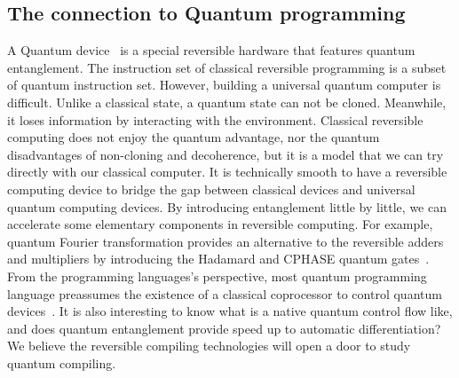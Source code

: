 \documentclass{article}
\newcommand{\<}{\langle}
\renewcommand{\>}{\rangle}
\theoremstyle{definition}\newtheorem{definition}{\textit{Definition}}
\begin{document}
\subsection{The connection to Quantum programming}
A Quantum device~\cite{Nielsen2002} is a special reversible hardware that features quantum entanglement.
The instruction set of classical reversible programming is a subset of quantum instruction set.
However, building a universal quantum computer is difficult. 
Unlike a classical state, a quantum state can not be cloned. Meanwhile, it loses information by interacting with the environment.
Classical reversible computing does not enjoy the quantum advantage, nor the quantum disadvantages of non-cloning and decoherence,
but it is a model that we can try directly with our classical computer.
It is technically smooth to have a reversible computing device to bridge the gap between classical devices and universal quantum computing devices.
By introducing entanglement little by little, we can accelerate some elementary components in reversible computing. For example, quantum Fourier transformation provides an alternative to the reversible adders and multipliers by introducing the Hadamard and CPHASE quantum gates~\cite{RuizPerez2017}.
From the programming languages's perspective, most quantum programming language preassumes the existence of a classical coprocessor to control quantum devices~\cite{Svore2018}.
It is also interesting to know what is a native quantum control flow like, and does quantum entanglement provide speed up to automatic differentiation?
We believe the reversible compiling technologies will open a door to study quantum compiling.
\end{document}

